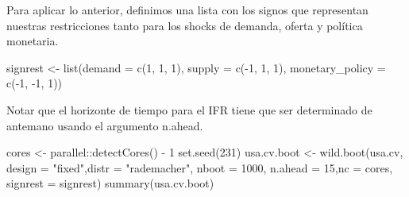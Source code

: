 \documentclass[
]{book}
\newenvironment{Shaded}{\begin{snugshade}}{\end{snugshade}}
\newcommand{\AttributeTok}[1]{\textcolor[rgb]{0.77,0.63,0.00}{#1}}
\newcommand{\DecValTok}[1]{\textcolor[rgb]{0.00,0.00,0.81}{#1}}
\newcommand{\FunctionTok}[1]{\textcolor[rgb]{0.00,0.00,0.00}{#1}}
\newcommand{\NormalTok}[1]{#1}
\newcommand{\OtherTok}[1]{\textcolor[rgb]{0.56,0.35,0.01}{#1}}
\newcommand{\SpecialCharTok}[1]{\textcolor[rgb]{0.00,0.00,0.00}{#1}}
\newcommand{\StringTok}[1]{\textcolor[rgb]{0.31,0.60,0.02}{#1}}
\begin{document}
Para aplicar lo anterior, definimos una lista con los signos que representan nuestras restricciones tanto para los shocks de demanda, oferta y política monetaria.

\begin{Shaded}
\begin{Highlighting}[]
\NormalTok{signrest }\OtherTok{\textless{}{-}} \FunctionTok{list}\NormalTok{(}\AttributeTok{demand =} \FunctionTok{c}\NormalTok{(}\DecValTok{1}\NormalTok{, }\DecValTok{1}\NormalTok{, }\DecValTok{1}\NormalTok{), }\AttributeTok{supply =} \FunctionTok{c}\NormalTok{(}\SpecialCharTok{{-}}\DecValTok{1}\NormalTok{, }\DecValTok{1}\NormalTok{, }\DecValTok{1}\NormalTok{), }\AttributeTok{monetary\_policy =} \FunctionTok{c}\NormalTok{(}\SpecialCharTok{{-}}\DecValTok{1}\NormalTok{, }\SpecialCharTok{{-}}\DecValTok{1}\NormalTok{, }\DecValTok{1}\NormalTok{))}
\end{Highlighting}
\end{Shaded}

Notar que el horizonte de tiempo para el IFR tiene que ser determinado de antemano usando el argumento n.ahead.

\begin{Shaded}
\begin{Highlighting}[]
\NormalTok{cores }\OtherTok{\textless{}{-}}\NormalTok{ parallel}\SpecialCharTok{::}\FunctionTok{detectCores}\NormalTok{() }\SpecialCharTok{{-}} \DecValTok{1}
\FunctionTok{set.seed}\NormalTok{(}\DecValTok{231}\NormalTok{)}
\NormalTok{usa.cv.boot }\OtherTok{\textless{}{-}} \FunctionTok{wild.boot}\NormalTok{(usa.cv, }\AttributeTok{design =} \StringTok{"fixed"}\NormalTok{,}\AttributeTok{distr =} \StringTok{"rademacher"}\NormalTok{, }\AttributeTok{nboot =} \DecValTok{1000}\NormalTok{, }\AttributeTok{n.ahead =} \DecValTok{15}\NormalTok{,}\AttributeTok{nc =}\NormalTok{ cores, }\AttributeTok{signrest =}\NormalTok{ signrest)}
\FunctionTok{summary}\NormalTok{(usa.cv.boot)}
\end{Highlighting}
\end{Shaded}
\end{document}

